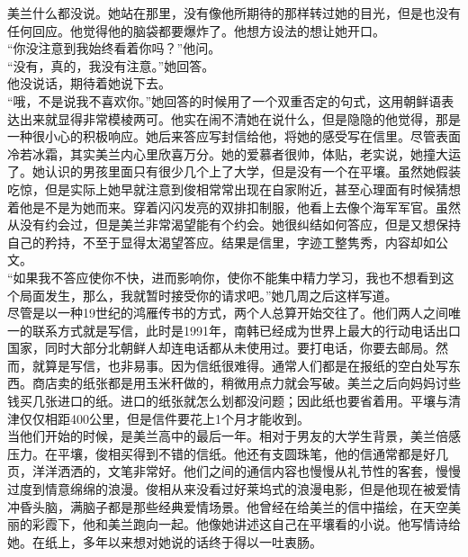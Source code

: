 美兰什么都没说。她站在那里，没有像他所期待的那样转过她的目光，但是也没有任何回应。他觉得他的脑袋都要爆炸了。他想方设法的想让她开口。\\

“你没注意到我始终看着你吗？”他问。\\

“没有，真的，我没有注意。”她回答。\\

他没说话，期待着她说下去。\\

“哦，不是说我不喜欢你。”她回答的时候用了一个双重否定的句式，这用朝鲜语表达出来就显得非常模棱两可。他实在闹不清她在说什么，但是隐隐的他觉得，那是一种很小心的积极响应。她后来答应写封信给他，将她的感受写在信里。尽管表面冷若冰霜，其实美兰内心里欣喜万分。她的爱慕者很帅，体贴，老实说，她撞大运了。她认识的男孩里面只有很少几个上了大学，但是没有一个在平壤。虽然她假装吃惊，但是实际上她早就注意到俊相常常出现在自家附近，甚至心理面有时候猜想着他是不是为她而来。穿着闪闪发亮的双排扣制服，他看上去像个海军军官。虽然从没有约会过，但是美兰非常渴望能有个约会。她很纠结如何答应，但是又想保持自己的矜持，不至于显得太渴望答应。结果是信里，字迹工整隽秀，内容却如公文。\\

“如果我不答应使你不快，进而影响你，使你不能集中精力学习，我也不想看到这个局面发生，那么，我就暂时接受你的请求吧。”她几周之后这样写道。\\

尽管是以一种19世纪的鸿雁传书的方式，两个人总算开始交往了。他们两人之间唯一的联系方式就是写信，此时是1991年，南韩已经成为世界上最大的行动电话出口国家，同时大部分北朝鲜人却连电话都从未使用过。要打电话，你要去邮局。然而，就算是写信，也非易事。因为信纸很难得。通常人们都是在报纸的空白处写东西。商店卖的纸张都是用玉米秆做的，稍微用点力就会写破。美兰之后向妈妈讨些钱买几张进口的纸。进口的纸张就怎么划都没问题；因此纸也要省着用。平壤与清津仅仅相距400公里，但是信件要花上1个月才能收到。\\

当他们开始的时候，是美兰高中的最后一年。相对于男友的大学生背景，美兰倍感压力。在平壤，俊相买得到不错的信纸。他还有支圆珠笔，他的信通常都是好几页，洋洋洒洒的，文笔非常好。他们之间的通信内容也慢慢从礼节性的客套，慢慢过度到情意绵绵的浪漫。俊相从来没看过好莱坞式的浪漫电影，但是他现在被爱情冲昏头脑，满脑子都是那些经典爱情场景。他曾经在给美兰的信中描绘，在天空美丽的彩霞下，他和美兰跑向一起。他像她讲述这自己在平壤看的小说。他写情诗给她。在纸上，多年以来想对她说的话终于得以一吐衷肠。\\

